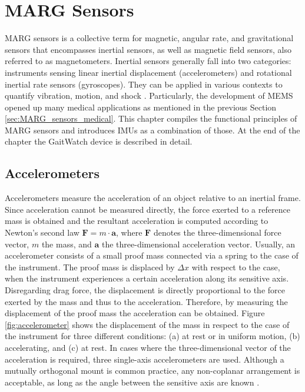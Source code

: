 \chapter{MARG Sensors}
\label{ch:MARG}

MARG sensors is a collective term for magnetic, angular rate, and gravitational sensors that encompasses inertial sensors, as well as magnetic field sensors, also referred to as magnetometers. Inertial sensors generally fall into two categories: instruments sensing linear inertial displacement (accelerometers) and rotational inertial rate sensors (gyroscopes). They can be applied in various contexts to quantify vibration, motion, and shock \cite{bhattacharyya_inertial_sensors_applications_13}. Particularly, the development of \gls{MEMS} opened up many medical applications as mentioned in the previous Section \ref{sec:MARG_sensors_medical}. This chapter compiles the functional principles of MARG sensors and introduces \glspl{IMU} as a combination of those. At the end of the chapter the GaitWatch device is described in detail.

\section{Accelerometers}

Accelerometers measure the acceleration of an object relative to an inertial frame. Since acceleration cannot be measured directly, the force exerted to a reference mass is obtained and the resultant acceleration is computed according to Newton's second law $\mathbf{F} = m \cdot \mathbf{a}$, where $ \mathbf{F}$ denotes the three-dimensional force vector, $m$ the mass, and $\mathbf{a}$ the three-dimensional acceleration vector. Usually, an accelerometer consists of a small proof mass connected via a spring to the case of the instrument. The proof mass is displaced  by $\Delta x$ with respect to the case, when the instrument experiences a certain acceleration along its sensitive axis. Disregarding drag force, the displacement is directly proportional to the force exerted by the mass and thus to the acceleration. Therefore, by measuring the displacement of the proof mass the acceleration can be obtained. Figure \ref{fig:accelerometer} shows the displacement  of the mass in respect to the case of the instrument for three different conditions: (a) at rest or in uniform motion, (b) accelerating, and (c) at rest. In cases where the three-dimensional vector of the acceleration is required, three single-axis accelerometers are used. Although a mutually orthogonal mount is common practice, any non-coplanar arrangement is acceptable, as long as the angle between the sensitive axis are known \cite{bhattacharyya_inertial_sensors_applications_13}.


